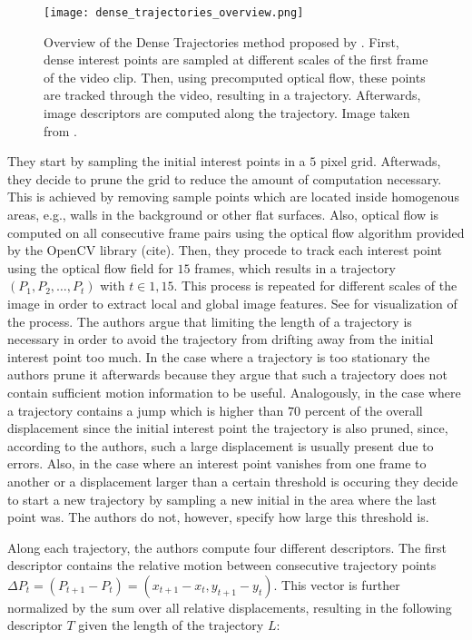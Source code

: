 \begin{figure}[htb!]
    \centering
    \texttt{[image: dense\_trajectories\_overview.png]}
    \caption{Overview of the Dense Trajectories method proposed by \cite{wang_dense_2013}. First, dense interest points are sampled at different scales of the first frame of the video clip. Then, using precomputed optical flow, these points are tracked through the video, resulting in a trajectory. Afterwards, image descriptors are computed along the trajectory. Image taken from \cite{wang_dense_2013}. }
    \label{fig:dense-trajectories-overview}
\end{figure}

They start by sampling the initial interest points in a $5$ pixel grid.
Afterwads, they decide to prune the grid to reduce the amount of computation necessary.
This is achieved by removing sample points which are located inside homogenous areas, e.g., walls in the background or other flat surfaces.
Also, optical flow is computed on all consecutive frame pairs using the optical flow algorithm provided by the OpenCV library (cite).
Then, they procede to track each interest point using the optical flow field for $15$ frames, which results in a trajectory $(P_1, P_2, \dots, P_t)$ with $t \in {1, 15}$.
This process is repeated for different scales of the image in order to extract local and global image features.
See  for visualization of the process.
The authors argue that limiting the length of a trajectory is necessary in order to avoid the trajectory from drifting away from the initial interest point too much.
In the case where a trajectory is too stationary the authors prune it afterwards because they argue that such a trajectory does not contain sufficient motion information to be useful.
Analogously, in the case where a trajectory contains a jump which is higher than $70$ percent of the overall displacement since the initial interest point the trajectory is also pruned, since, according to the authors, such a large displacement is usually present due to errors.
Also, in the case where an interest point vanishes from one frame to another or a displacement larger than a certain threshold is occuring they decide to start a new trajectory by sampling a new initial in the area where the last point was.
The authors do not, however, specify how large this threshold is.

Along each trajectory, the authors compute four different descriptors.
The first descriptor contains the relative motion between consecutive trajectory points $\Delta P_t = (P_{t+1} - P_t) = (x_{t+1} - x_t, y_{t+1} - y_t)$.
This vector is further normalized by the sum over all relative displacements, resulting in the following descriptor $T$ given the length of the trajectory $L$:

